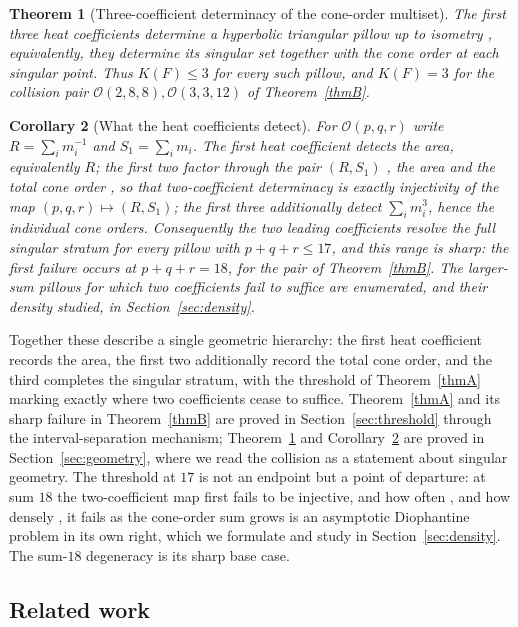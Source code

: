 \documentclass[12pt, letterpaper]{article}
\theoremstyle{definition}
\theoremstyle{plain}
\newtheorem{mainthm}{Theorem}
\newtheorem{maincor}[mainthm]{Corollary}
\begin{document}
\begin{mainthm}[Three-coefficient determinacy of the cone-order multiset]\label{thmC}
The first three heat coefficients determine a hyperbolic triangular pillow up to isometry ,  equivalently, they determine its singular set together with the cone order at each singular point. Thus $K(F)\le3$ for every such pillow, and $K(F)=3$ for the collision pair $\mathcal{O}(2,8,8),\mathcal{O}(3,3,12)$ of Theorem~\ref{thmB}.
\end{mainthm}

\begin{maincor}[What the heat coefficients detect]\label{corD}
For $\mathcal{O}(p,q,r)$ write $R=\sum_i m_i^{-1}$ and $S_1=\sum_i m_i$. The first heat coefficient detects the area, equivalently $R$; the first two factor through the pair $(R,S_1)$ ,  the area and the total cone order ,  so that two-coefficient determinacy is exactly injectivity of the map $(p,q,r)\mapsto(R,S_1)$; the first three additionally detect $\sum_i m_i^3$, hence the individual cone orders. Consequently the two leading coefficients resolve the full singular stratum for every pillow with $p+q+r\le17$, and this range is sharp: the first failure occurs at $p+q+r=18$, for the pair of Theorem~\ref{thmB}. The larger-sum pillows for which two coefficients fail to suffice are enumerated, and their density studied, in Section~\ref{sec:density}.
\end{maincor}

Together these describe a single geometric hierarchy: the first heat coefficient records the area, the first two additionally record the total cone order, and the third completes the singular stratum, with the threshold of Theorem~\ref{thmA} marking exactly where two coefficients cease to suffice. Theorem~\ref{thmA} and its sharp failure in Theorem~\ref{thmB} are proved in Section~\ref{sec:threshold} through the interval-separation mechanism; Theorem~\ref{thmC} and Corollary~\ref{corD} are proved in Section~\ref{sec:geometry}, where we read the collision as a statement about singular geometry. The threshold at $17$ is not an endpoint but a point of departure: at sum $18$ the two-coefficient map first fails to be injective, and how often ,  and how densely ,  it fails as the cone-order sum grows is an asymptotic Diophantine problem in its own right, which we formulate and study in Section~\ref{sec:density}. The sum-$18$ degeneracy is its sharp base case.

\subsection{Related work}
\label{sec:related}
\end{document}
